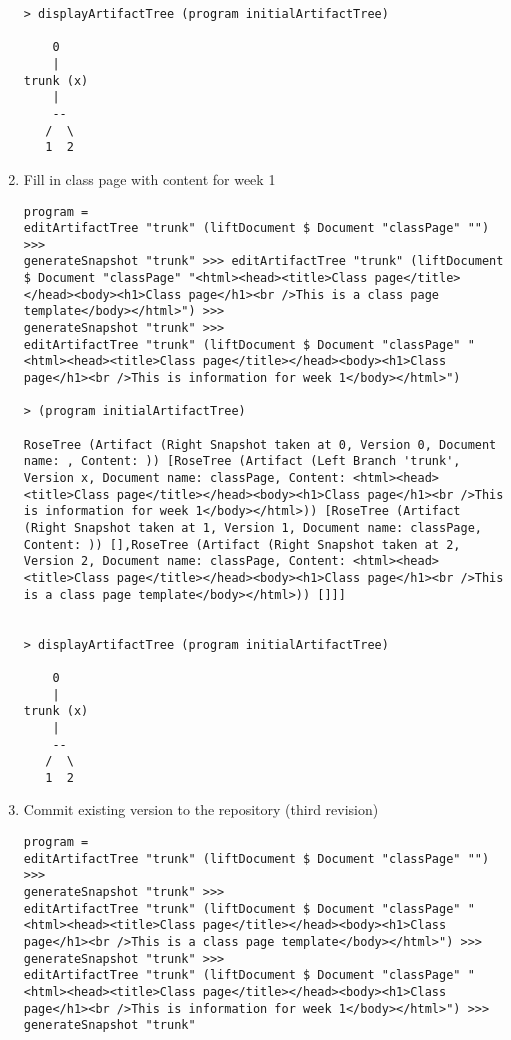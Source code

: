 \documentclass[11pt]{article}
\begin{document}
\begin{enumerate}
\begin{lstlisting}
> displayArtifactTree (program initialArtifactTree)

    0    
    |    
trunk (x)
    |    
    --   
   /  \  
   1  2  

\end{lstlisting}
\item Fill in class page with content for week 1
 \begin{lstlisting}
program = 
editArtifactTree "trunk" (liftDocument $ Document "classPage" "") >>> 
generateSnapshot "trunk" >>> editArtifactTree "trunk" (liftDocument $ Document "classPage" "<html><head><title>Class page</title></head><body><h1>Class page</h1><br />This is a class page template</body></html>") >>> 
generateSnapshot "trunk" >>> 
editArtifactTree "trunk" (liftDocument $ Document "classPage" "<html><head><title>Class page</title></head><body><h1>Class page</h1><br />This is information for week 1</body></html>")  

> (program initialArtifactTree)

RoseTree (Artifact (Right Snapshot taken at 0, Version 0, Document name: , Content: )) [RoseTree (Artifact (Left Branch 'trunk', Version x, Document name: classPage, Content: <html><head><title>Class page</title></head><body><h1>Class page</h1><br />This is information for week 1</body></html>)) [RoseTree (Artifact (Right Snapshot taken at 1, Version 1, Document name: classPage, Content: )) [],RoseTree (Artifact (Right Snapshot taken at 2, Version 2, Document name: classPage, Content: <html><head><title>Class page</title></head><body><h1>Class page</h1><br />This is a class page template</body></html>)) []]]


> displayArtifactTree (program initialArtifactTree)

    0    
    |    
trunk (x)
    |    
    --   
   /  \  
   1  2  

\end{lstlisting}
\item Commit existing version to the repository (third revision)
 \begin{lstlisting}
program = 
editArtifactTree "trunk" (liftDocument $ Document "classPage" "") >>> 
generateSnapshot "trunk" >>> 
editArtifactTree "trunk" (liftDocument $ Document "classPage" "<html><head><title>Class page</title></head><body><h1>Class page</h1><br />This is a class page template</body></html>") >>> 
generateSnapshot "trunk" >>> 
editArtifactTree "trunk" (liftDocument $ Document "classPage" "<html><head><title>Class page</title></head><body><h1>Class page</h1><br />This is information for week 1</body></html>") >>> 
generateSnapshot "trunk"  


\end{lstlisting}
\end{enumerate}
\end{document}
